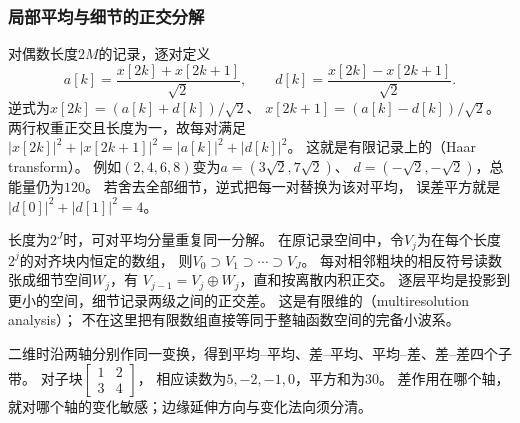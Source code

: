 \subsubsection{局部平均与细节的正交分解}
\label{sec:signal-haar-decomposition}
对偶数长度$2M$的记录，逐对定义
\begin{equation}
 a[k]=\frac{x[2k]+x[2k+1]}{\sqrt2},\qquad
 d[k]=\frac{x[2k]-x[2k+1]}{\sqrt2}.
 \label{eq:signal-haar-pair}
\end{equation}
逆式为$x[2k]=(a[k]+d[k])/\sqrt2$、
$x[2k+1]=(a[k]-d[k])/\sqrt2$。
两行权重正交且长度为一，故每对满足
$|x[2k]|^2+|x[2k+1]|^2=|a[k]|^2+|d[k]|^2$。
这就是有限记录上的（Haar transform）。
例如$(2,4,6,8)$变为$a=(3\sqrt2,7\sqrt2)$、
$d=(-\sqrt2,-\sqrt2)$，总能量仍为$120$。
若舍去全部细节，逆式把每一对替换为该对平均，
误差平方就是$|d[0]|^2+|d[1]|^2=4$。

长度为$2^J$时，可对平均分量重复同一分解。
在原记录空间中，令$V_j$为在每个长度$2^j$的对齐块内恒定的数组，
则$V_0\supset V_1\supset\cdots\supset V_J$。
每对相邻粗块的相反符号读数张成细节空间$W_j$，有
$V_{j-1}=V_j\oplus W_j$，直和按离散内积正交。
逐层平均是投影到更小的空间，细节记录两级之间的正交差。
这是有限维的（multiresolution analysis）；
不在这里把有限数组直接等同于整轴函数空间的完备小波系。

二维时沿两轴分别作同一变换，得到平均--平均、差--平均、平均--差、差--差四个子带。
对子块$\begin{bmatrix}1&2\\3&4\end{bmatrix}$，
相应读数为$5,-2,-1,0$，平方和为$30$。
差作用在哪个轴，就对哪个轴的变化敏感；边缘延伸方向与变化法向须分清。

